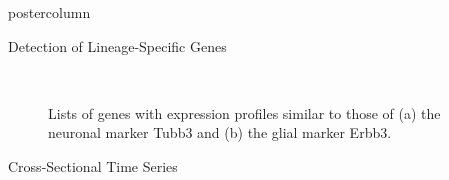 \documentclass{beamer}
\begin{document}
\begin{frame}
\begin{columns}
\begin{column}{.45\textwidth}
\begin{beamercolorbox}[center]{postercolumn}
\begin{minipage}{.98\textwidth}
{\begin{myblock}{Detection of Lineage-Specific Genes}
\begin{figure}
\begin{minipage}{0.9\textwidth}
	 \\
	\caption{Lists of genes with expression profiles similar to those of
			(a) the neuronal marker Tubb3 and (b) the glial marker Erbb3.}
	\label{fig:genebars}
\end{minipage}
\end{figure}
\end{myblock}\vfill
\begin{myblock}{Cross-Sectional Time Series}


\end{myblock}}
\end{minipage}
\end{beamercolorbox}
\end{column}
\end{columns}
\end{frame}
\end{document}
